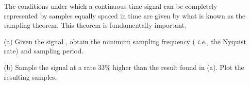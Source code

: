 \documentclass{article}
\begin{document}
\begin{CellGroup}


The conditions under which a continuous-time signal can be completely represented by samples equally spaced in time are given by what is known as
the sampling theorem. This theorem is fundamentally important.



\begin{CellGroup}
(a) Given the signal , obtain the minimum sampling frequency ({\itshape
i.e.,} the Nyquist rate) and sampling period.



(b) Sample the signal at a rate 33\%{} higher than the result found in (a). Plot the resulting samples.


\end{CellGroup}

\end{CellGroup}
\end{document}
